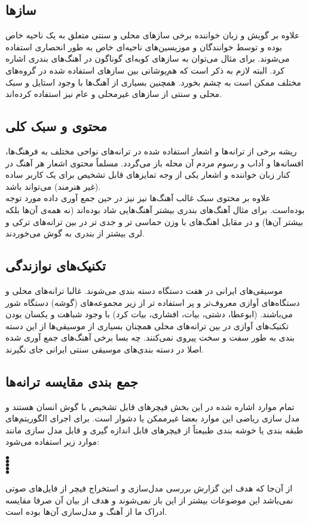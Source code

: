 \subsection{سازها}
علاوه بر گویش و زبان خواننده برخی سازهای محلی و سنتی متعلق به یک ناحیه خاص بوده و توسط خوانندگان و موزیسین‌های ناحیه‌ای خاص به طور انحصاری استفاده می‌شوند. برای مثال می‌توان به سازهای کوبه‌ای گوناگون در آهنگ‌های بندری اشاره کرد. البته لازم به ذکر است که هم‌پوشانی بین سازهای استفاده شده در گروه‌های مختلف ممکن است به چشم بخورد. همچنین بسیاری از آهنگ‌ها با وجود استایل و سبک محلی و سنتی از سازهای غیرمحلی و عام نیز استفاده کرده‌اند.
\subsection{محتوی و سبک کلی}
ریشه برخی از ترانه‌ها و اشعار استفاده شده در ترانه‌های نواحی مختلف به فرهنگ‌ها، افسانه‌ها و آداب و رسوم مردم آن محله باز می‌گردد. مسلماً محتوی اشعار هر آهنگ در کنار زبان خواننده و اشعار یکی از وجه تمایزهای قابل تشخیص برای یک کاربر ساده (غیر هنرمند) می‌تواند باشد.\\
علاوه بر محتوی سبک غالب آهنگ‌ها نیز نیز در حین جمع آوری داده مورد توجه بوده‌است. برای مثال آهنگ‌های بندری بیشتر آهنگ‌هایی شاد بوده‌اند (نه همه‌ی آن‌ها بلکه بیشتر آن‌ها) و در مقابل اهنگ‌های با وزن حماسی تر و جدی تر در بین ترانه‌های ترکی و لری بیشتر از بندری به گوش می‌خوردند.
\subsection{تکنیک‌های نوازندگی}
موسیقی‌های ایرانی در هفت دستگاه دسته بندی می‌شوند. غالبا ترانه‌های محلی و دستگاه‌های آوازی معروف‌تر و پر استفاده تر از زیر مجموعه‌های (گوشه) دستگاه شور می‌باشند. (ابوعطا، دشتی، بیات، افشاری، بیات کرد) با وجود شباهت و یکسان بودن تکنیک‌های آوازی در بین ترانه‌های محلی همچنان بسیاری از موسیقی‌ها از این دسته بندی به طور سفت و سخت پیروی نمی‌کنند. چه بسا برخی آهنگ‌های جمع آوری شده اصلا در دسته بندی‌های موسیقی سنتی ایرانی جای نگیرند.
\subsection{جمع بندی مقایسه ترانه‌ها}
تمام موارد اشاره شده در این بخش فیچرهای قابل تشخیص با گوش انسان هستند و مدل سازی ریاضی این موارد بعضا غیرممکن یا دشوار است. برای اجرای الگوریتم‌های طبقه بندی یا خوشه بندی طبیعتاً از فیچرهای قابل اندازه گیری و قابل مدل سازی مانند موارد زیر استفاده می‌شود:
\begin{description}
    \item[$\bullet$] 
    \item[$\bullet$] 
    \item[$\bullet$] 
    \item[$\bullet$] 
    \item[$\bullet$]  
\end{description}
از آن‌جا که هدف این گزارش بررسی مدل‌سازی و استخراج فیچر از فایل‌های صوتی نمی‌باشد این موضوعات بیشتر از این باز نمی‌شوند و هدف از بیان آن صرفا مقایسه ادراک ما از آهنگ و مدل‌سازی آن‌ها بوده است. 